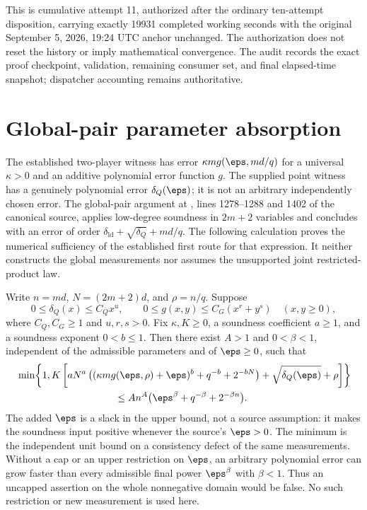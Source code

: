 \documentclass[11pt]{article}
\begin{document}
This is cumulative attempt 11, authorized after the ordinary ten-attempt
disposition, carrying exactly 19931 completed working seconds with the
original September 5, 2026, 19:24 UTC anchor unchanged. The authorization
does not reset the history or imply mathematical convergence. The audit
records the exact proof checkpoint, validation, remaining consumer set,
and final elapsed-time snapshot; dispatcher accounting remains authoritative.

\section{Global-pair parameter absorption}

The established two-player witness has error
$\kappa m g(\eps,md/q)$ for a universal $\kappa>0$ and an additive
polynomial error function $g$. The supplied point witness has a genuinely
polynomial error $\delta_Q(\eps)$; it is not an arbitrary independently
chosen error. The global-pair argument at
, lines 1278--1288 and 1402 of the canonical source,
applies low-degree soundness in $2m+2$ variables and concludes with an
error of order $\delta_{\mathrm{ld}}+\sqrt{\delta_Q}+md/q$.
The following calculation proves the numerical sufficiency of the
established first route for that expression. It neither constructs the
global measurements nor assumes the unsupported joint restricted-product law.

Write $n=md$, $N=(2m+2)d$, and $\rho=n/q$. Suppose
\[
 0\leq\delta_Q(x)\leq C_Qx^u,\qquad
 0\leq g(x,y)\leq C_G(x^r+y^s)\quad(x,y\geq0),
\]
where $C_Q,C_G\geq1$ and $u,r,s>0$. Fix $\kappa,K\geq0$, a
soundness coefficient $a\geq1$, and a soundness exponent $0<b\leq1$.
Then there exist $A>1$ and $0<\beta<1$, independent of the admissible
parameters and of $\eps\geq0$, such that
\begin{align*}
 &\min\!\left\{1,K\left[
 aN^a\left((\kappa m g(\eps,\rho)+\eps)^b+q^{-b}+2^{-bN}\right)
 +\sqrt{\delta_Q(\eps)}+\rho\right]\right\}\\
 &\hspace{35mm}\leq A n^A\bigl(\eps^\beta+q^{-\beta}+2^{-\beta n}\bigr).
\end{align*}
The added $\eps$ is a slack in the upper bound, not a source assumption:
it makes the soundness input positive whenever the source's $\eps>0$.
The minimum is the independent unit bound on a consistency defect of the
same measurements. Without a cap or an upper restriction on $\eps$, an
arbitrary polynomial error can grow faster than every admissible final
power $\eps^\beta$ with $\beta<1$. Thus an uncapped assertion on the
whole nonnegative domain would be false. No such restriction or new
measurement is used here.
\end{document}
